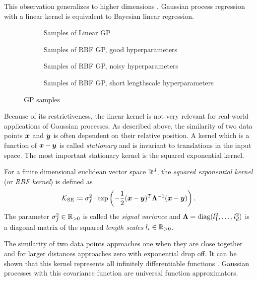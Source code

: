 This observation generalizes to higher dimensions \cite{rasmussen_gaussian_2006}.
Gaussian process regression with a linear kernel is equivalent to Bayesian linear regression.
\begin{figure}[htb]
    \centering
    \begin{subfigure}{\subfigurewidth}
        \caption{Samples of Linear GP}
        \label{fig:gp_samples:linear}
    \end{subfigure}
    \begin{subfigure}{\subfigurewidth}
        \caption{Samples of RBF GP, good hyperparameters}
        \label{fig:gp_samples:rbf_normal}
    \end{subfigure}
    \begin{subfigure}{\subfigurewidth}
        \caption{Samples of RBF GP, noisy hyperparameters}
        \label{fig:gp_samples:rbf_noisy}
    \end{subfigure}
    \begin{subfigure}{\subfigurewidth}
        \caption{Samples of RBF GP, short lengthscale hyperparameters}
        \label{fig:gp_samples:rbf_noisy}
    \end{subfigure}
    \caption{GP samples}
    \label{fig:gp_samples}
\end{figure}

Because of its restrictiveness, the linear kernel is not very relevant for real-world applications of Gaussian processes.
As described above, the similarity of two data points $\bm{x}$ and $\bm{y}$ is often dependent on their relative position.
A kernel which is a function of $\bm{x} - \bm{y}$ is called \emph{stationary} and is invariant to translations in the input space.
The most important stationary kernel is the squared exponential kernel.
\begin{definition}
    For a finite dimensional euclidean vector space $\mathbb{R}^d$, the \emph{squared exponential kernel} (or \emph{RBF kernel}) is defined as
    \begin{align}
        \operatorname{\mathcal{K}}_{\text{SE}} \coloneqq \sigma_f^2 \cdot \exp \left( -\frac{1}{2} (\bm{x} - \bm{y})^T \bm{\Lambda}^{-1} (\bm{x} - \bm{y}) \right).
    \end{align}
    The parameter $\sigma_f^2 \in \mathbb{R}_{>0}$ is called the \emph{signal variance} and $\bm{\Lambda} = \operatorname{diag}(l_1^2, \dots, l_d^2)$ is a diagonal matrix of the squared \emph{length scales} $l_i \in \mathbb{R}_{>0}$.
\end{definition}
The similarity of two data points approaches one when they are close together and for larger distances approaches zero with exponential drop off.
It can be shown that this kernel represents all infinitely differentiable functions \cite{rasmussen_gaussian_2006}.
Gaussian processes with this covariance function are universal function approximators.

